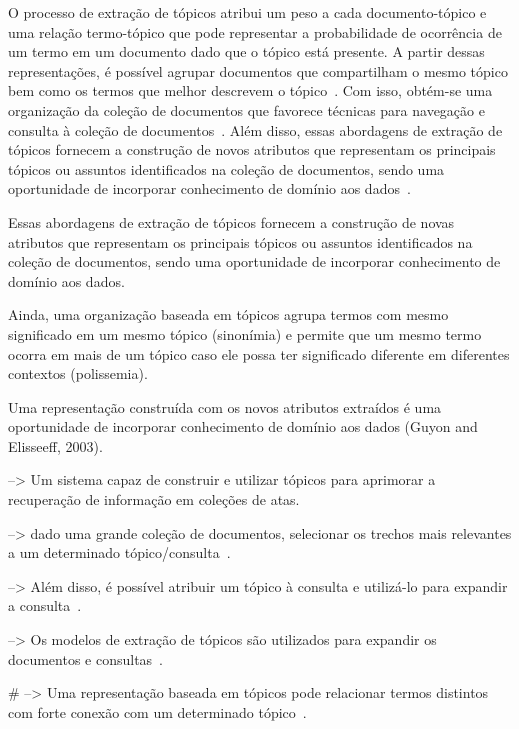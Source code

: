 O processo de extração de tópicos atribui um peso a cada documento-tópico e uma relação termo-tópico que pode representar a probabilidade de ocorrência de um termo em um documento dado que o tópico está presente. A partir dessas representações, é possível agrupar documentos que compartilham o mesmo tópico bem como os termos que melhor descrevem o tópico~\cite{Aggarwal2018}. Com isso, obtém-se uma organização da coleção de documentos que favorece técnicas para navegação e consulta à coleção de documentos~\cite{Maracini2010}. 
% 
Além disso, essas abordagens de extração de tópicos fornecem a construção de novos atributos que representam os principais tópicos ou assuntos identificados na coleção de documentos, sendo uma oportunidade de incorporar conhecimento de domínio aos dados~\cite{Guyon2003}. 







Essas abordagens de extração de tópicos fornecem a construção de novas atributos que representam os principais tópicos ou assuntos identificados na coleção de documentos, sendo uma oportunidade de incorporar conhecimento de domínio aos dados. 

Ainda, uma organização baseada em tópicos agrupa termos com mesmo significado em um mesmo tópico (sinonímia) e permite que um mesmo termo ocorra em mais de um tópico caso ele possa ter significado diferente em diferentes contextos (polissemia). 


Uma representação construída com os novos atributos extraídos é uma oportunidade de incorporar conhecimento de domínio aos dados (Guyon and Elisseeff, 2003).




--> { Um sistema capaz de construir e utilizar tópicos para aprimorar a recuperação de informação em coleções de atas. }

--> { dado uma grande coleção de documentos, selecionar os trechos mais relevantes a um determinado tópico/consulta~\cite{Zhai2017}. }

--> Além disso, é possível atribuir um tópico à consulta e utilizá-lo para expandir a consulta~\cite{Xing2009}. 

--> Os modelos de extração de tópicos são utilizados para expandir os documentos e consultas~\cite{WEI2007}.

# --> Uma representação baseada em tópicos pode relacionar termos distintos com forte conexão com um determinado tópico~\cite{Wei2006}.

